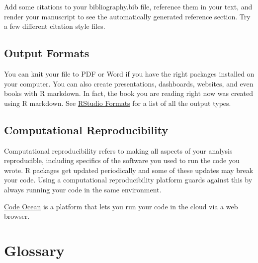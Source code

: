 \documentclass[
  oneside]{book}
\begin{document}
\begin{info}
Add some citations to your bibliography.bib file, reference them in your text, and render your manuscript to see the automatically generated reference section. Try a few different citation style files.

\end{info}

\hypertarget{output-formats}{%
\subsection{Output Formats}\label{output-formats}}

You can knit your file to PDF or Word if you have the right packages installed on your computer. You can also create presentations, dashboards, websites, and even books with R markdown. In fact, the book you are reading right now was created using R markdown. See \href{https://rmarkdown.rstudio.com/formats.html}{RStudio Formats} for a list of all the output types.

\hypertarget{computational-reproducibility}{%
\subsection{Computational Reproducibility}\label{computational-reproducibility}}

Computational reproducibility refers to making all aspects of your analysis reproducible, including specifics of the software you used to run the code you wrote. R packages get updated periodically and some of these updates may break your code. Using a computational reproducibility platform guards against this by always running your code in the same environment.

\href{https://codeocean.com/}{Code Ocean} is a platform that lets you run your code in the cloud via a web browser.

\hypertarget{glossary-repro}{%
\section{Glossary}\label{glossary-repro}}
\end{document}
